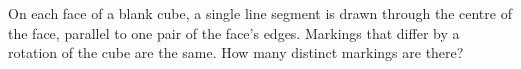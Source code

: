 On each face of a blank cube, a single line segment is drawn through the centre of the face, parallel to one pair of the face's edges. Markings that differ by a rotation of the cube are the same. How many distinct markings are there?
